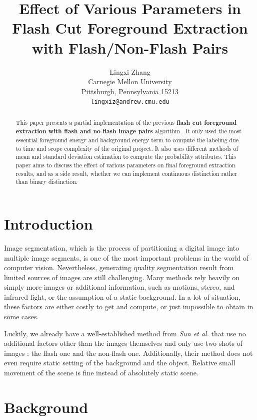 \documentclass[final]{cvpr}
\author{Lingxi Zhang
\\ Carnegie Mellon University
\\ Pittsburgh, Pennsylvania 15213
\\ {\tt\small lingxiz@andrew.cmu.edu}
}
\title{Effect of Various Parameters in Flash Cut Foreground Extraction with Flash/Non-Flash Pairs}
\begin{document}
\maketitle


\begin{abstract}
   This paper presents a partial implementation of the previous 
   \textbf{flash cut foreground extraction with flash and no-flash image pairs} 
   algorithm \cite{Authors1}. It only used the most essential foreground energy
   and background energy term to compute the labeling due to time and scope 
   complexity of the original project. It also uses different methods of 
   mean and standard deviation estimation to compute the probability attributes. 
   This paper aims to discuss the effect of various parameters on final foreground 
   extraction results, and as a side result, whether we can implement continuous distinction 
   rather than binary distinction.

\end{abstract}

\section{Introduction}

Image segmentation, which is the process of partitioning a digital image into multiple 
image segments, is one of the most important problems in the world of 
computer vision. Nevertheless, generating quality segmentation result
from limited sources of images are still challenging. Many methods rely 
heavily on simply more images or additional information, such as motions, 
stereo, and infrared light, or the assumption of a static background.
In a lot of situation, these factors are either costly to get and compute, 
or just impossible to obtain in some cases. 

Luckily, we already have a 
well-established method from \textit{Sun et al.} that use no additional factors 
other than the images themselves and only use two shots of images : the flash
one and the non-flash one. Additionally, their method does not even require 
static setting of the background and the object. Relative small movement of the scene 
is fine instead of absolutely static scene.
\section{Background}
\end{document}
